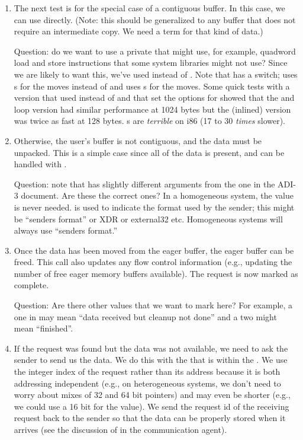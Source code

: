 \begin{enumerate}
\item The next test is for the special case of a contiguous buffer.  In this
  case, we can use  directly.  (Note: this should be
  generalized to any buffer that does not require an intermediate
  copy.  We need a term for that kind of data.)

  Question: do we want to use a private  that might use, for 
  example, quadword load and store instructions that some system libraries
  might not use?  Since we are likely to want this, we've used
   instead of .  Note that 
  has a  switch;  uses s for the
  moves instead of  and  uses
  s for the moves.  Some quick tests with a version that used
   instead of  and that set the options
   for  showed that the
   and  loop version had similar performance at
  1024 bytes but the (inlined)  version was twice as fast at
  128 bytes.  s are \emph{terrible} on i86 (17 to 30
  \emph{times} slower).

\item Otherwise, the user's buffer is not contiguous, and the data must be
  unpacked.  This is a simple case since all of the data is present, and 
  can be handled with .

  Question: note that  has slightly different arguments
  from the one in the ADI-3 document.  Are these the correct ones?  In a
  homogeneous system, the  value is never needed.
   is used to indicate the format used by the sender; this
  might be ``senders format'' or XDR or external32 etc.  Homogeneous systems
  will always use ``senders format.''

\item Once the data has been moved from the eager buffer, the eager buffer 
 can be freed.  This call also updates any flow control information (e.g.,
 updating the number of free eager memory buffers available).  The request is
 now marked as complete.

  Question: Are there other values that we want to mark here?  For example, 
  a one in  may mean ``data received but cleanup not done'' and
  a two might mean ``finished''.

\item If the request was found but the data was not available, we need to ask
  the sender to send us the data.  We do this with the  that is
  within the .  We use the integer index of the
  request rather than its address because it is both addressing independent
  (e.g., on heterogeneous systems, we don't need to worry about mixes of 32
  and 64 bit pointers) and may even be shorter (e.g., we could use a 16 bit
   for the value).  We send the request id of the receiving
  request back to the sender so that the data can be properly stored when it
  arrives (see the discussion of  in the
  communication agent).


\end{enumerate}
